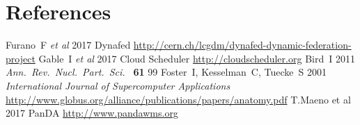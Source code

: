 \documentclass[a4paper]{jpconf}
\begin{document}
\section*{References}
\begin{thebibliography}{9}
  Furano~F {\it et al}
  2017
  Dynafed
  \url{http://cern.ch/lcgdm/dynafed-dynamic-federation-project}
  Gable~I {\it et al}
  2017
  Cloud Scheduler
  \url{http://cloudscheduler.org}
  Bird~I
  2011
  {\it Ann.\ Rev.\ Nucl.\ Part.\ Sci.\ } {\bf 61} 99
  Foster~I, Kesselman~C, Tuecke~S
  2001
  {\it International Journal of Supercomputer Applications}
  \url{http://www.globus.org/alliance/publications/papers/anatomy.pdf}
  T.Maeno et al
  2017
  PanDA
  \url{http://www.pandawms.org}



\end{thebibliography}
\end{document}
